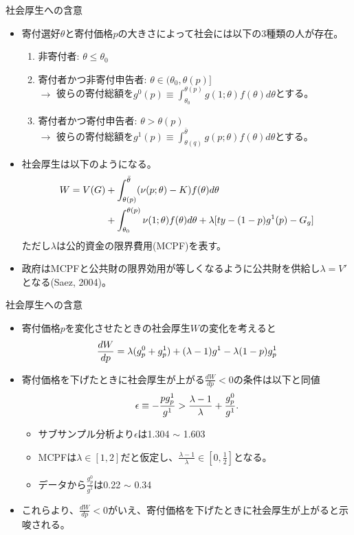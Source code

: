 \documentclass[dvipdfmx,10pt]{beamer}
\begin{document}
\begin{frame}{社会厚生への含意}
	\begin{itemize}
		\item 寄付選好$\theta$と寄付価格$p$の大きさによって社会には以下の3種類の人が存在。
		\begin{enumerate}
			\item 非寄付者: $\theta\le \theta_0$
			\item 寄付者かつ非寄付申告者: $\theta\in(\theta_0,\theta(p)]$\\
			$\to$ 彼らの寄付総額を$g^0(p)\equiv\int_{\theta_0}^{\theta(p)}g(1;\theta)f(\theta)d\theta$とする。
			\item 寄付者かつ寄付申告者: $\theta>\theta(p)$\\
			$\to$ 彼らの寄付総額を$g^1(p)\equiv\int_{\theta(q)}^{\bar{\theta}}g(p;\theta)f(\theta)d\theta$とする。
		\end{enumerate}
	\item 社会厚生は以下のようになる。
	\begin{align}
		W=V(G)&+\int_{\theta(p)}^{\bar{\theta}}(\nu(p;\theta)-K)f(\theta)d\theta\notag\\
		&+\int_{\theta_0}^{\theta(p)}\nu(1;\theta)f(\theta)d\theta+\lambda[ty-(1-p)g^1(p)-G_g]\notag
	\end{align}
	ただし$\lambda$は公的資金の限界費用(MCPF)を表す。
	\item 政府はMCPFと公共財の限界効用が等しくなるように公共財を供給し$\lambda=V'$となる(Saez, 2004)。
	\end{itemize}
\end{frame}

\begin{frame}{社会厚生への含意}
	\begin{itemize}
		\item 寄付価格$p$を変化させたときの社会厚生$W$の変化を考えると
		\begin{align}
			\frac{dW}{dp} =\lambda (g_p^0+g_p^1)+(\lambda-1)g^1-\lambda(1-p)g_p^1\notag
		\end{align}
		\item 寄付価格を下げたときに社会厚生が上がる$\frac{dW}{dp}<0$の条件は以下と同値
		\begin{align}
			\epsilon\equiv -\frac{pg_p^1}{g^1}>\frac{\lambda-1}{\lambda}+\frac{g_p^0}{g^1}\notag.
		\end{align}
		\begin{itemize}
		\item サブサンプル分析より$\epsilon$は1.304 $\sim$ 1.603
		\item MCPFは$\lambda\in[1,2]$だと仮定し、$\frac{\lambda-1}{\lambda}\in[0,\frac12]$となる。
		\item データから$\frac{g_p^0}{g^1}$は0.22 $\sim$ 0.34
		\end{itemize}
		\item これらより、$\frac{dW}{dp}<0$がいえ、寄付価格を下げたときに社会厚生が上がると示唆される。
	\end{itemize}
\end{frame}
\end{document}
